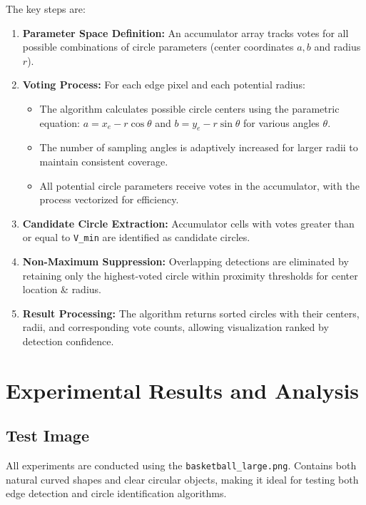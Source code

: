 \documentclass[12pt,a4paper]{article}
\begin{document}
The key steps are:
\begin{enumerate}
    \item \textbf{Parameter Space Definition:} An accumulator array tracks votes for all possible combinations of circle parameters (center coordinates $a,b$ and radius $r$).
    
    \item \textbf{Voting Process:} For each edge pixel and each potential radius:
        \begin{itemize}
            \item The algorithm calculates possible circle centers using the parametric equation: $a = x_e - r \cos\theta$ and $b = y_e - r \sin\theta$ for various angles $\theta$.
            \item The number of sampling angles is adaptively increased for larger radii to maintain consistent coverage.
            \item All potential circle parameters receive votes in the accumulator, with the process vectorized for efficiency.
        \end{itemize}
    
    \item \textbf{Candidate Circle Extraction:} Accumulator cells with votes greater than or equal to \texttt{V\_min} are identified as candidate circles.
    
    \item \textbf{Non-Maximum Suppression:} Overlapping detections are eliminated by retaining only the highest-voted circle within proximity thresholds for center location \& radius.
    
    \item \textbf{Result Processing:} The algorithm returns sorted circles with their centers, radii, and corresponding vote counts, allowing visualization ranked by detection confidence.
\end{enumerate}






\section{Experimental Results and Analysis}

\subsection*{Test Image}

All experiments are conducted using the \texttt{basketball\_large.png}. Contains both natural curved shapes and clear circular objects, making it ideal for testing both edge detection and circle identification algorithms.
\end{document}

